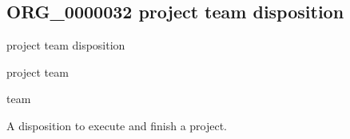 \documentclass[letterpaper,10pt,english]{sphinxmanual}
\begin{document}
\begin{sphinxShadowBox}

\sphinxAtStartPar
{}
\end{sphinxShadowBox}
\begin{quote}

\ignorespaces \end{quote}


\subsection{ORG\_0000032 \sphinxhyphen{} project team disposition}
\label{\detokenize{doc-ORG_0000032:org-0000032-project-team-disposition}}\label{\detokenize{doc-ORG_0000032:index-0}}\label{\detokenize{doc-ORG_0000032::doc}}
\begin{sphinxShadowBox}

\sphinxAtStartPar
project team disposition
\end{sphinxShadowBox}

\begin{sphinxShadowBox}

\sphinxAtStartPar
project team
\end{sphinxShadowBox}

\begin{sphinxShadowBox}

\sphinxAtStartPar
team
\end{sphinxShadowBox}

\begin{sphinxShadowBox}

\sphinxAtStartPar
{\hyperref[\detokenize{doc-BFO_0000016::doc}]{}}
\end{sphinxShadowBox}

\begin{sphinxShadowBox}

\sphinxAtStartPar
A disposition to execute and finish a project.
\end{sphinxShadowBox}
\end{document}
